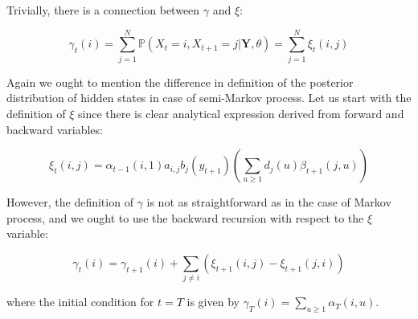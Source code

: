 \noindent Trivially, there is a connection between $\gamma$ and $\xi$:

\begin{equation}
    \gamma_t(i) = \sum_{j=1}^N \mathbb{P}(X_t=i, X_{t+1}=j|\textbf{Y},\theta) = \sum_{j=1}^N \xi_t(i,j)
\end{equation}

Again we ought to mention the difference in definition of the posterior distribution of hidden states in case of semi-Markov process. Let us start with the definition of $\xi$ since
there is clear analytical expression derived from forward and backward variables:

\begin{equation}
    \xi_t(i,j) = \alpha_{t-1}(i,1) a_{i,j} b_j(y_{t+1}) \left( \sum\limits_{u \geq 1} d_j(u) \beta_{t+1}(j,u) \right)
\end{equation}

\noindent However, the definition of $\gamma$ is not as straightforward as in the case of Markov process, and we ought to use the backward recursion with respect to the $\xi$ variable:

\begin{equation}
    \gamma_t(i) = \gamma_{t+1}(i) + \sum\limits_{j \neq i} \left( \xi_{t+1}(i,j) - \xi_{t+1}(j,i)\right)
\end{equation}

where the initial condition for $t=T$ is given by $\gamma_T(i) = \sum\limits_{u \geq 1} \alpha_T(i,u)$.

